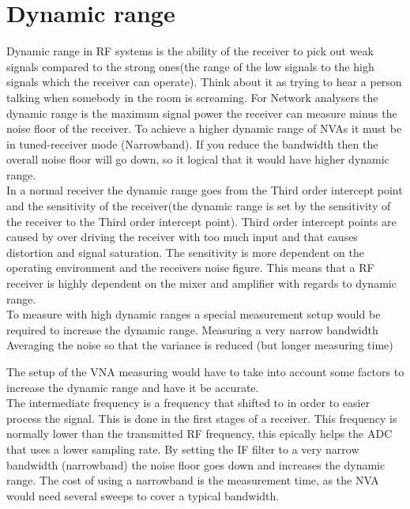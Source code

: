 \section{Dynamic range}
Dynamic range in RF systems is the ability of the receiver to pick out weak signals compared to the strong ones(the range of the low signals to the high signals which the receiver can operate). Think about it as trying to hear a person talking when somebody in the room is screaming. For Network analysers the dynamic range is the maximum signal power the receiver can measure minus the noise floor of the receiver. To achieve a higher dynamic range of NVAs it must be  in tuned-receiver mode (Narrowband). If you reduce the bandwidth then the overall noise floor will go down, so it logical that it would have higher dynamic range. \citep{AgilentNVA} \\
In a normal receiver the dynamic range goes from the Third order intercept point and the sensitivity of the receiver(the dynamic range is set by the sensitivity of the receiver to the Third order intercept point). Third order intercept points are caused by over driving the receiver with too much input and that causes distortion and signal saturation. The sensitivity is more dependent on the operating environment and the receivers noise figure. \citep{understandDynamic} This means that a RF receiver is highly dependent on the mixer and amplifier with regards to dynamic range.\\
To measure with high dynamic ranges a special measurement setup would be required to increase the dynamic range.
Measuring a very narrow bandwidth
Averaging the noise so that the variance is reduced (but longer measuring time)

The setup of the VNA measuring would have to take into account some factors to increase the dynamic range and have it be accurate. \\
The intermediate frequency is a frequency that shifted to in order to easier process the signal. This is done in the first stages of a receiver. This frequency is normally lower than the transmitted RF frequency, this epically helps the ADC that uses a lower sampling rate. 
By setting the IF filter to a very narrow bandwidth (narrowband) the noise floor goes down and increases the dynamic range. The cost of using a narrowband is the measurement time, as the NVA would need several sweeps to cover a typical bandwidth.

